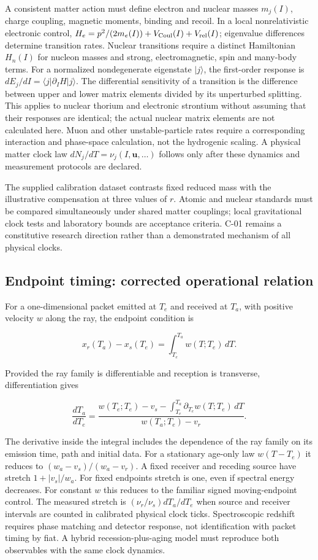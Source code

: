 \documentclass[
  11pt,
  twoside]{article}
\begin{document}
A consistent matter action must define electron and nuclear masses
\(m_j(I)\), charge coupling, magnetic moments, binding and recoil. In a
local nonrelativistic electronic control,
\(H_e=p^2/(2m_e(I))+V_{\rm Coul}(I)+V_{\rm rel}(I)\); eigenvalue
differences determine transition rates. Nuclear transitions require a
distinct Hamiltonian \(H_n(I)\) for nucleon masses and strong,
electromagnetic, spin and many-body terms. For a normalized
nondegenerate eigenstate \(|j\rangle\), the first-order response is
\(dE_j/dI=\langle j|\partial_I H|j\rangle\). The differential
sensitivity of a transition is the difference between upper and lower
matrix elements divided by its unperturbed splitting. This applies to
nuclear thorium and electronic strontium without assuming that their
responses are identical; the actual nuclear matrix elements are not
calculated here. Muon and other unstable-particle rates require a
corresponding interaction and phase-space calculation, not the
hydrogenic scaling. A physical matter clock law
\(dN_j/dT=\nu_j(I,\mathbf{u},\ldots)\) follows only after these dynamics
and measurement protocols are declared.

The supplied calibration dataset contrasts fixed reduced mass with the
illustrative compensation at three values of \(r\). Atomic and nuclear
standards must be compared simultaneously under shared matter couplings;
local gravitational clock tests and laboratory bounds are acceptance
criteria. C-01 remains a constitutive research direction rather than a
demonstrated mechanism of all physical clocks.

\subsection{Endpoint timing: corrected operational
relation}\label{endpoint-timing-corrected-operational-relation}

For a one-dimensional packet emitted at \(T_e\) and received at \(T_a\),
with positive velocity \(w\) along the ray, the endpoint condition is

\[x_r(T_a)-x_s(T_e)=\int_{T_e}^{T_a}w(T;T_e)\,dT.\]

Provided the ray family is differentiable and reception is transverse,
differentiation gives

\[\frac{dT_a}{dT_e}=\frac{w(T_e;T_e)-v_s-\int_{T_e}^{T_a}\partial_{T_e}w(T;T_e)\,dT}{w(T_a;T_e)-v_r}.\]

The derivative inside the integral includes the dependence of the ray
family on its emission time, path and initial data. For a stationary
age-only law \(w(T-T_e)\) it reduces to \((w_a-v_s)/(w_a-v_r)\). A fixed
receiver and receding source have stretch \(1+|v_s|/w_a\). For fixed
endpoints stretch is one, even if spectral energy decreases. For
constant \(w\) this reduces to the familiar signed moving-endpoint
control. The measured stretch is \((\nu_r/\nu_s)dT_a/dT_e\) when source
and receiver intervals are counted in calibrated physical clock ticks.
Spectroscopic redshift requires phase matching and detector response,
not identification with packet timing by fiat. A hybrid
recession-plus-aging model must reproduce both observables with the same
clock dynamics.
\end{document}
